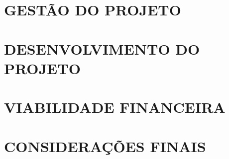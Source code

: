 \documentclass[
12pt,				%
openany,			%
oneside,			%
a4paper,			%
english,			%
french,				%
spanish,			%
brazil				%
chapter=TITLE %
]{abntex2}
\begin{document}
	\cleardoublepage
	\chapter{GESTÃO DO PROJETO}
	
	
	
	\addtocounter{chapter}{-1}
	\chapter{DESENVOLVIMENTO DO PROJETO}
	
	
	\cleardoublepage
	\chapter{VIABILIDADE FINANCEIRA}
	
	
	\cleardoublepage
	\chapter{CONSIDERAÇÕES FINAIS}
	

	
	\renewcommand{\bibname}{REFERÊNCIAS} %
	
	
	
	
	
	
	
	\begin{apendicesenv}
		
		\partapendices
		
		
		
		
	
		
	\end{apendicesenv}
	
\end{document}
